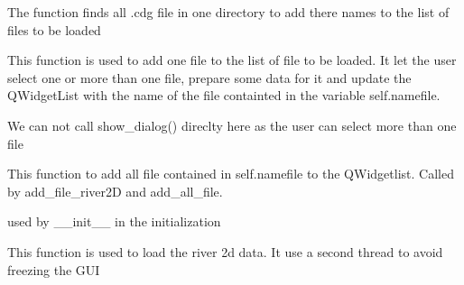 \documentclass[letterpaper,10pt,english]{sphinxmanual}
\begin{document}
\begin{fulllineitems}
\begin{fulllineitems}
\label{\detokenize{index:src_GUI.hydro_GUI_2.River2D.add_all_file}}
The function finds all .cdg file in one directory to add there names to the list of files to be loaded

\end{fulllineitems}


\begin{fulllineitems}
\label{\detokenize{index:src_GUI.hydro_GUI_2.River2D.add_file_river2d}}
This function is used to add one file to the list of file to be loaded.
It let the user select one or more than one file, prepare some data for it and update the QWidgetList with
the name of the file containted in the variable self.namefile.

We can not call show\_dialog() direclty here as the user can select more than one file

\end{fulllineitems}


\begin{fulllineitems}
\label{\detokenize{index:src_GUI.hydro_GUI_2.River2D.add_file_to_list}}
This function to add all file contained in self.namefile to the QWidgetlist. Called by add\_file\_river2D and
add\_all\_file.

\end{fulllineitems}


\begin{fulllineitems}
\label{\detokenize{index:src_GUI.hydro_GUI_2.River2D.init_iu}}
used by \_\_init\_\_ in the initialization

\end{fulllineitems}


\begin{fulllineitems}
\label{\detokenize{index:src_GUI.hydro_GUI_2.River2D.load_river2d_gui}}
This function is used to load the river 2d data. It use a second thread to avoid freezing the GUI


\end{fulllineitems}
\end{fulllineitems}
\end{document}
